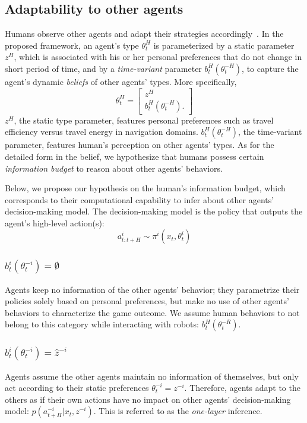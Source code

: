 \documentclass[letterpaper, 10 pt, conference]{ieeeconf}  %
\begin{document}
\vspace{-.2em}
\subsection{Adaptability to other agents}\label{sec:adaptability}
\vspace{-.2em}
Humans observe other agents and adapt their strategies 
accordingly~\cite{nikolaidis2016formalizing,yang2017evaluating}. In the 
proposed framework, 
an agent's type $\theta^H_t$ is parameterized by a static parameter $z^H$, 
which is associated with his or her personal preferences that do not change in short period 
of time, and by a \textit{time-variant} parameter $b^H_t(\theta^{-H}_t)$, to 
capture the agent's dynamic \textit{beliefs} of other agents' types.
More specifically,
\begin{equation}
  \theta^H_t = \begin{bmatrix}
    z^H \\
    b^H_t(\theta^{-H}_t).
  \end{bmatrix}
\end{equation}
  $z^H$, the static type parameter, features personal 
  preferences such as travel efficiency versus travel energy in navigation 
  domains. $b^H_t(\theta^{-H}_t)$, the time-variant parameter, features 
  human's perception on other agents' types. 
  As for the detailed form in the belief, we hypothesize that 
  humans possess certain \textit{information budget} to reason about other agents' behaviors.

 Below, we propose our hypothesis on the human's information budget, which 
 corresponds to their computational capability to infer about other agents' 
 decision-making model. The decision-making model is the policy that outputs 
 the agent's high-level action(s):
 \begin{equation}
   a^i_{t:t+H} \sim \pi^i(x_t,\theta^i_t)
 \end{equation}
\subsubsection{$b^i_t(\theta^{-i}_t) = \emptyset$} 
Agents keep no information of the 
other agents' behavior; they parametrize their policies solely based on personal 
preferences, but make no use of other agents' behaviors to characterize the 
game outcome. We assume human behaviors to not belong to this 
category while interacting with robots: $b^H_t(\theta^{-R}_t)$.

\subsubsection{$b^i_t(\theta^{-i}_t) = \hat{z}^{-i}$}
Agents assume the other agents maintain no information of themselves, but only 
act according to their static preferences $\theta^{-i}_t = z^{-i}$. Therefore, 
agents adapt to the others as if their own actions have no impact on other 
agents' decision-making model: $p(a^{-i}_{t+H}|x_t, z^{-i})$. This is referred 
to as the \textit{one-layer} inference.
\end{document}
